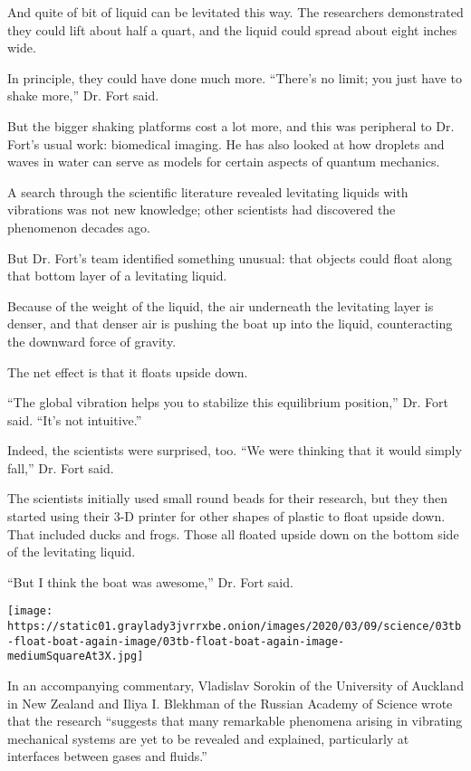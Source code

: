 And quite of bit of liquid can be levitated this way. The researchers
demonstrated they could lift about half a quart, and the liquid could
spread about eight inches wide.

In principle, they could have done much more. ``There's no limit; you
just have to shake more,'' Dr. Fort said.

But the bigger shaking platforms cost a lot more, and this was
peripheral to Dr. Fort's usual work: biomedical imaging. He has also
looked at how droplets and waves in water can serve as models for
certain aspects of quantum mechanics.

A search through the scientific literature revealed levitating liquids
with vibrations was not new knowledge; other scientists had discovered
the phenomenon decades ago.

But Dr. Fort's team identified something unusual: that objects could
float along that bottom layer of a levitating liquid.

Because of the weight of the liquid, the air underneath the levitating
layer is denser, and that denser air is pushing the boat up into the
liquid, counteracting the downward force of gravity.

The net effect is that it floats upside down.

``The global vibration helps you to stabilize this equilibrium
position,'' Dr. Fort said. ``It's not intuitive.''

Indeed, the scientists were surprised, too. ``We were thinking that it
would simply fall,'' Dr. Fort said.

The scientists initially used small round beads for their research, but
they then started using their 3-D printer for other shapes of plastic to
float upside down. That included ducks and frogs. Those all floated
upside down on the bottom side of the levitating liquid.

``But I think the boat was awesome,'' Dr. Fort said.

\texttt{[image: https://static01.graylady3jvrrxbe.onion/images/2020/03/09/science/03tb-float-boat-again-image/03tb-float-boat-again-image-mediumSquareAt3X.jpg]}

In an accompanying commentary, Vladislav Sorokin of the University of
Auckland in New Zealand and Iliya I. Blekhman of the Russian Academy of
Science wrote that the research ``suggests that many remarkable
phenomena arising in vibrating mechanical systems are yet to be revealed
and explained, particularly at interfaces between gases and fluids.''

